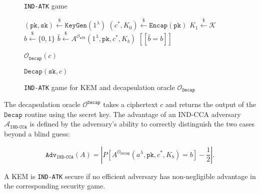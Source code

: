 \documentclass[runningheads]{llncs}
\newcommand{\keygen}{\texttt{KeyGen}}
\newcommand{\encap}{\texttt{Encap}}
\newcommand{\decap}{\texttt{Decap}}
\newcommand{\pk}{\texttt{pk}}
\newcommand{\sk}{\texttt{sk}}
\newcommand{\leftsample}{\stackrel{\$}{\leftarrow}}
\newcommand{\llbrack}{[\![}
\newcommand{\rrbrack}{]\!]}
\newcommand{\norm}[1]{\left\lvert #1 \right\rvert}
\newcommand{\adv}{\texttt{Adv}}
\begin{document}
\begin{figure}[h]
    \centering
    \begin{minipage}[t]{0.49\textwidth}
        \begin{algorithm}[H]
            \caption*{\texttt{IND-ATK} game}
            \begin{algorithmic}[1]
                \State $(\pk, \sk) \leftsample \keygen(1^\lambda)$
                \State $(c^\ast, K_0) \leftsample \encap(\pk)$
                \State $K_1 \leftsample \mathcal{K}$
                \State $b \leftsample \{0, 1\}$
                \State $\hat{b} \leftsample A^{\mathcal{O}_\texttt{ATK}}(
                    1^\lambda, \pk, c^\ast, K_b
                )$
                \State \Return $\llbrack \hat{b} = b \rrbrack$
            \end{algorithmic}
        \end{algorithm}
    \end{minipage}\hfill
    \begin{minipage}[t]{0.49\textwidth}
        \begin{algorithm}[H]
        \caption*{$\mathcal{O}_\decap(c)$}
        \begin{algorithmic}[1]
            \State \Return $\decap(\sk, c)$
        \end{algorithmic}
        \end{algorithm}
    \end{minipage}
    \caption{\texttt{IND-ATK} game for KEM and decapsulation oracle $\mathcal{O}_\decap$}\label{fig:kem-game}
\end{figure}

The decapsulation oracle $\mathcal{O}^\decap$ takes a ciphertext $c$ and returns the output of the $\decap$ routine using the secret key. The advantage of an IND-CCA adversary $\mathcal{A}_\texttt{IND-CCA}$ is defined by the adversary's ability to correctly distinguish the two cases beyond a blind guess:

\begin{equation*}
    \adv_\texttt{IND-CCA}(A) = \norm{
        P[A^{\mathcal{O}_\decap}(a^\lambda, \pk, c^\ast, K_b) = b] - \frac{1}{2}
    }.
\end{equation*}

A KEM is \texttt{IND-ATK} secure if no efficient adversary has non-negligible advantage in the corresponding security game.
\end{document}
